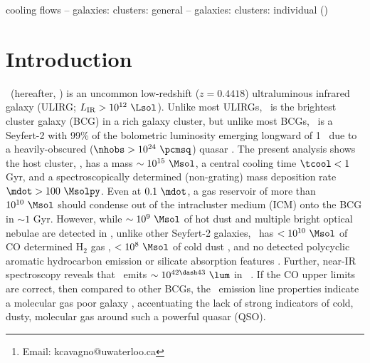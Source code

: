 \documentclass[useAMS,usenatbib]{mn2e}
\title[\mystitle]{\mytitle}
\author[Cavagnolo et al.]{K. Cavagnolo$^{1}$\thanks{Email:
    kcavagno@uwaterloo.ca}, M. Donahue$^{2}$, B. McNamara$^{1,3,4}$,
  G. M. Voit$^{2}$, and M. Sun$^{3}$\\
$^{1}$Department of Physics and Astronomy, University of Waterloo,
Waterloo, ON N2L 3G1, Canada.\\
$^{2}$Department of Physics and Astronomy, Michigan State University,
East Lansing, MI, 48824-2320, USA.\\
$^{3}$Perimeter Institute for Theoretical Physics, 31 Caroline St. N.,
Waterloo, Ontario, N2L 2Y5, Canada\\
$^{4}$Harvard-Smithsonian Center for Astrophysics, 60 Garden Street,
Cambridge, MA 02138, USA\\
$^{5}$Department of Astronomy, University of Virginia,
Charlottesville, VA, 22904, USA.}
\begin{document}
\date{Accepted 2010 Month DD. Received 2010 Month DD; in original form 2010 Month DD}

\pagerange{\pageref{firstpage}--\pageref{lastpage}} 

\maketitle

\label{firstpage}


\begin{abstract}
We report on new \chandra\ X-ray Observations of \iras.
\end{abstract}


\begin{keywords}
cooling flows -- galaxies: clusters: general -- galaxies:
  clusters: individual (\iras)
\end{keywords}

\section{Introduction}
\label{sec:intro}

\iras\ (hereafter, \irs) is an uncommon low-redshift ($z = 0.4418$)
ultraluminous infrared galaxy (ULIRG; $L_{\mathrm{IR}} > 10^{12}
~\Lsol$). Unlike most ULIRGs, \irs\ is the brightest cluster galaxy
(BCG) in a rich galaxy cluster, but unlike most BCGs, \irs\ is a
Seyfert-2 with 99\% of the bolometric luminosity emerging longward of
1 \mymicron\ due to a heavily-obscured ($\nhobs > 10^{24} ~\pcmsq$)
quasar \citep{1988ApJ...328..161K, 1993ApJ...415...82H,
  1994ApJ...436L..51F, 1998ApJ...506..205E, 2000A&A...353..910F,
  2001MNRAS.321L..15I}. The present analysis shows the host cluster,
\rxj, has a mass $\sim 10^{15} ~\Msol$, a central cooling time $\tcool
< 1$ Gyr, and a spectroscopically determined (non-grating) mass
deposition rate $\mdot > 100 ~\Msolpy$. Even at $0.1 ~\mdot$, a gas
reservoir of more than $10^{10} ~\Msol$ should condense out of the
intracluster medium (ICM) onto the BCG in $\sim 1$ Gyr. However, while
$\sim 10^9 ~\Msol$ of hot dust \citep{1997A&A...318L...1T} and
multiple bright optical nebulae are detected in \irs, unlike other
Seyfert-2 galaxies, \irs\ has $< 10^{10} ~\Msol$ of CO determined
H$_2$ gas \citep{1998ApJ...506..205E}, $< 10^8 ~\Msol$ of cold dust
\citep{2001MNRAS.326.1467D}, and no detected polycyclic aromatic
hydrocarbon emission or silicate absorption features
\citep{2004ApJ...613..986P, 2008ApJ...683..114S}. Further, near-IR
spectroscopy reveals that \irs\ emits $\sim 10^{42 \dash 43} ~\lum$ in
\halpha\ \citep{1996MNRAS.283.1003C, 1998ApJ...506..205E}. If the CO
upper limits are correct, then compared to other BCGs, the
\irs\ emission line properties indicate a molecular gas poor galaxy
\citep{2001MNRAS.328..762E}, accentuating the lack of strong
indicators of cold, dusty, molecular gas around such a powerful quasar
(QSO).
\end{document}
